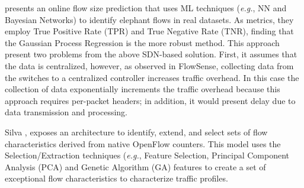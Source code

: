 \cite{poupart_online_2016} presents an online flow size prediction that uses ML techniques (\textit{e.g.}, NN and Bayesian Networks) to identify elephant flows in real datasets. As metrics, they employ True Positive Rate (TPR) and True Negative Rate (TNR), finding that the Gaussian Process Regression is the more robust method. This approach present two problems from the above SDN-based solution. First, it assumes that the data is centralized, however, as observed in FlowSense, collecting data from the switches to a centralized controller increases traffic overhead. In this case the collection of data exponentially increments the traffic overhead because this approach requires per-packet headers; in addition, it would present delay due to data transmission and processing. 

Silva \cite{silva_2015:identification_selection_traffic}, exposes an architecture to identify, extend, and select sets of flow characteristics derived from native OpenFlow counters. This model uses the Selection/Extraction techniques (\textit{e.g.}, Feature Selection, Principal Component Analysis (PCA) and Genetic Algorithm (GA) features to create a set of exceptional flow characteristics to characterize traffic profiles.





